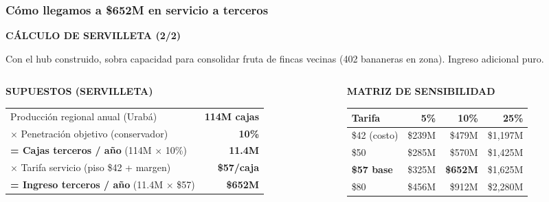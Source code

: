 \documentclass[aspectratio=169, 10pt]{beamer}
\newcommand{\tagline}[2]{{\scriptsize\color{#1}\textbf{\MakeUppercase{#2}}}}
\begin{document}
\begin{frame}
\frametitle{C\'omo llegamos a \$652M en servicio a terceros}
\tagline{verde}{C\'alculo de Servilleta (2/2)}
\vspace{-2pt}

{\tiny Con el hub construido, sobra capacidad para consolidar fruta de fincas vecinas (402 bananeras en zona). Ingreso adicional puro.}

\vspace{4pt}
\begin{columns}[T]
\begin{column}{0.48\textwidth}
{\tiny\color{verde}\textbf{SUPUESTOS (SERVILLETA)}}
\vspace{2pt}

\tiny
\renewcommand{\arraystretch}{1.05}
\begin{tabular}{l r}
    \toprule
    Producci\'on regional anual (Urab\'a) & \textcolor{verde}{\textbf{114M cajas}} \\
    $\times$ Penetraci\'on objetivo (conservador) & \textcolor{verde}{\textbf{10\%}} \\
    \midrule
    \textbf{= Cajas terceros / a\~no} (114M $\times$ 10\%) & \textcolor{verde}{\textbf{11.4M}} \\
    $\times$ Tarifa servicio (piso \$42 + margen) & \textcolor{verde}{\textbf{\$57/caja}} \\
    \rowcolor{verdeclaro}
    \textbf{= Ingreso terceros / a\~no} (11.4M $\times$ \$57) & \textcolor{verde}{\textbf{\$652M}} \\
    \bottomrule
\end{tabular}
\end{column}

\begin{column}{0.48\textwidth}
{\tiny\color{verde}\textbf{MATRIZ DE SENSIBILIDAD}}
\vspace{2pt}

\tiny
\renewcommand{\arraystretch}{1.05}
\begin{tabular}{l r r r}
    \toprule
    \textbf{Tarifa} & \textbf{5\%} & \textbf{10\%} & \textbf{25\%} \\
    \midrule
    \rowcolor{rojoclaro}
    {\color{gris}\$42 (costo)} & {\color{gris}\$239M} & {\color{gris}\$479M} & {\color{gris}\$1,197M} \\
    \$50 & \$285M & \$570M & \$1,425M \\
    \rowcolor{verdeclaro}
    \textcolor{verde}{\textbf{\$57 base}} & \$325M & \textcolor{verde}{\textbf{\$652M}} & \$1,625M \\
    \$80 & \$456M & \$912M & \$2,280M \\
    \bottomrule
\end{tabular}


\end{column}
\end{columns}
\end{frame}
\end{document}
